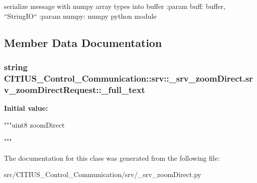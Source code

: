 \begin{DoxyVerb}
serialize message with numpy array types into buffer
:param buff: buffer, ``StringIO``
:param numpy: numpy python module
\end{DoxyVerb}
 

\subsection{\-Member \-Data \-Documentation}
\hypertarget{class_c_i_t_i_u_s___control___communication_1_1srv_1_1__srv__zoom_direct_1_1srv__zoom_direct_request_aee20620903c3dadd0d07022d0d802909}{
\subsubsection[{\-\_\-full\-\_\-text}]{\setlength{\rightskip}{0pt plus 5cm}string \-C\-I\-T\-I\-U\-S\-\_\-\-Control\-\_\-\-Communication\-::srv\-::\-\_\-srv\-\_\-zoom\-Direct.\-srv\-\_\-zoom\-Direct\-Request\-::\-\_\-full\-\_\-text}}\label{class_c_i_t_i_u_s___control___communication_1_1srv_1_1__srv__zoom_direct_1_1srv__zoom_direct_request_aee20620903c3dadd0d07022d0d802909}
{\bfseries \-Initial value\-:}
\begin{DoxyCode}
"""uint8 zoomDirect

"""
\end{DoxyCode}


\-The documentation for this class was generated from the following file\-:\begin{DoxyCompactItemize}
\item 
src/\-C\-I\-T\-I\-U\-S\-\_\-\-Control\-\_\-\-Communication/srv/\-\_\-srv\-\_\-zoom\-Direct.\-py\end{DoxyCompactItemize}
